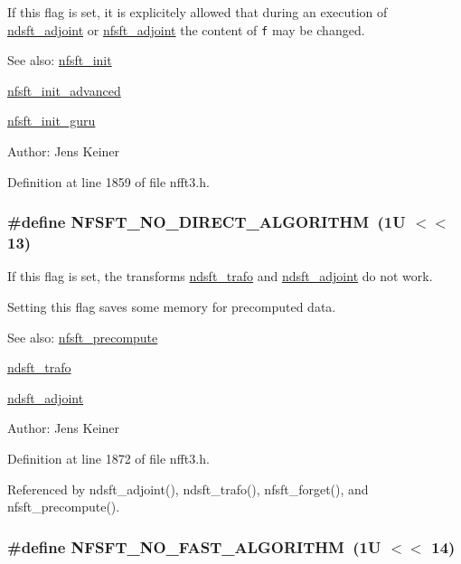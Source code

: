 If this flag is set, it is explicitely allowed that during an execution of \hyperlink{group__nfsft_ga7}{ndsft\_\-adjoint} or \hyperlink{group__nfsft_ga9}{nfsft\_\-adjoint} the content of {\tt f} may be changed. 

\begin{Desc}
\item[See also:]\hyperlink{group__nfsft_ga1}{nfsft\_\-init} 

\hyperlink{group__nfsft_ga2}{nfsft\_\-init\_\-advanced} 

\hyperlink{group__nfsft_ga3}{nfsft\_\-init\_\-guru} \end{Desc}
\begin{Desc}
\item[Author:]Jens Keiner \end{Desc}


Definition at line 1859 of file nfft3.h.\hypertarget{group__nfsft_ga37}{
\subsubsection[NFSFT\_\-NO\_\-DIRECT\_\-ALGORITHM]{\setlength{\rightskip}{0pt plus 5cm}\#define NFSFT\_\-NO\_\-DIRECT\_\-ALGORITHM~(1U $<$$<$ 13)}}
\label{group__nfsft_ga37}


If this flag is set, the transforms \hyperlink{group__nfsft_ga6}{ndsft\_\-trafo} and \hyperlink{group__nfsft_ga7}{ndsft\_\-adjoint} do not work. 

Setting this flag saves some memory for precomputed data.

\begin{Desc}
\item[See also:]\hyperlink{group__nfsft_ga4}{nfsft\_\-precompute} 

\hyperlink{group__nfsft_ga6}{ndsft\_\-trafo} 

\hyperlink{group__nfsft_ga7}{ndsft\_\-adjoint} \end{Desc}
\begin{Desc}
\item[Author:]Jens Keiner \end{Desc}


Definition at line 1872 of file nfft3.h.

Referenced by ndsft\_\-adjoint(), ndsft\_\-trafo(), nfsft\_\-forget(), and nfsft\_\-precompute().\hypertarget{group__nfsft_ga38}{
\subsubsection[NFSFT\_\-NO\_\-FAST\_\-ALGORITHM]{\setlength{\rightskip}{0pt plus 5cm}\#define NFSFT\_\-NO\_\-FAST\_\-ALGORITHM~(1U $<$$<$ 14)}}
\label{group__nfsft_ga38}



